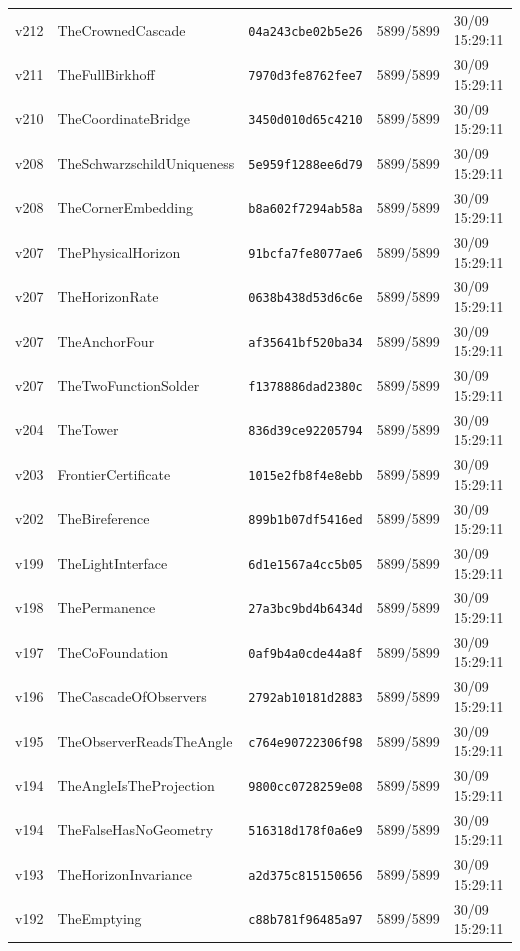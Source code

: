 \documentclass[11pt]{article}
\theoremstyle{definition}\newtheorem{deriv}{Derivação}
\begin{document}
{\begin{longtable}{@{}lllll@{}}
v212 & TheCrownedCascade & \texttt{04a243cbe02b5e26} & 5899/5899 & 30/09 15:29:11 \\
v211 & TheFullBirkhoff & \texttt{7970d3fe8762fee7} & 5899/5899 & 30/09 15:29:11 \\
v210 & TheCoordinateBridge & \texttt{3450d010d65c4210} & 5899/5899 & 30/09 15:29:11 \\
v208 & TheSchwarzschildUniqueness & \texttt{5e959f1288ee6d79} & 5899/5899 & 30/09 15:29:11 \\
v208 & TheCornerEmbedding & \texttt{b8a602f7294ab58a} & 5899/5899 & 30/09 15:29:11 \\
v207 & ThePhysicalHorizon & \texttt{91bcfa7fe8077ae6} & 5899/5899 & 30/09 15:29:11 \\
v207 & TheHorizonRate & \texttt{0638b438d53d6c6e} & 5899/5899 & 30/09 15:29:11 \\
v207 & TheAnchorFour & \texttt{af35641bf520ba34} & 5899/5899 & 30/09 15:29:11 \\
v207 & TheTwoFunctionSolder & \texttt{f1378886dad2380c} & 5899/5899 & 30/09 15:29:11 \\
v204 & TheTower & \texttt{836d39ce92205794} & 5899/5899 & 30/09 15:29:11 \\
v203 & FrontierCertificate & \texttt{1015e2fb8f4e8ebb} & 5899/5899 & 30/09 15:29:11 \\
v202 & TheBireference & \texttt{899b1b07df5416ed} & 5899/5899 & 30/09 15:29:11 \\
v199 & TheLightInterface & \texttt{6d1e1567a4cc5b05} & 5899/5899 & 30/09 15:29:11 \\
v198 & ThePermanence & \texttt{27a3bc9bd4b6434d} & 5899/5899 & 30/09 15:29:11 \\
v197 & TheCoFoundation & \texttt{0af9b4a0cde44a8f} & 5899/5899 & 30/09 15:29:11 \\
v196 & TheCascadeOfObservers & \texttt{2792ab10181d2883} & 5899/5899 & 30/09 15:29:11 \\
v195 & TheObserverReadsTheAngle & \texttt{c764e90722306f98} & 5899/5899 & 30/09 15:29:11 \\
v194 & TheAngleIsTheProjection & \texttt{9800cc0728259e08} & 5899/5899 & 30/09 15:29:11 \\
v194 & TheFalseHasNoGeometry & \texttt{516318d178f0a6e9} & 5899/5899 & 30/09 15:29:11 \\
v193 & TheHorizonInvariance & \texttt{a2d375c815150656} & 5899/5899 & 30/09 15:29:11 \\
v192 & TheEmptying & \texttt{c88b781f96485a97} & 5899/5899 & 30/09 15:29:11 \\

\end{longtable}}
\end{document}
